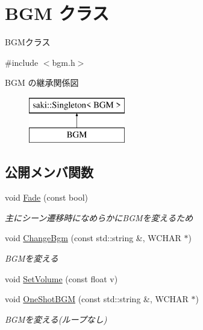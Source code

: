 \hypertarget{class_b_g_m}{}\section{B\+GM クラス}
\label{class_b_g_m}


B\+G\+Mクラス  




{\ttfamily \#include $<$bgm.\+h$>$}

B\+GM の継承関係図\begin{figure}[H]
\begin{center}
\leavevmode
\includegraphics[height=2.000000cm]{class_b_g_m}
\end{center}
\end{figure}
\subsection*{公開メンバ関数}
\begin{DoxyCompactItemize}
\item 
void \mbox{\hyperlink{class_b_g_m_a63645262b99c4d3aef0a58d9b972f674}{Fade}} (const bool)
\begin{DoxyCompactList}\small\item\em 主にシーン遷移時になめらかに\+B\+G\+Mを変えるため \end{DoxyCompactList}\item 
void \mbox{\hyperlink{class_b_g_m_a67e626cf0e596ca4fcf74df02fadf882}{Change\+Bgm}} (const std\+::string \&, W\+C\+H\+AR $\ast$)
\begin{DoxyCompactList}\small\item\em B\+G\+Mを変える \end{DoxyCompactList}\item 
void \mbox{\hyperlink{class_b_g_m_a6d5d9eddf086075d2b579c3a8061cc8c}{Set\+Volume}} (const float v)
\item 
void \mbox{\hyperlink{class_b_g_m_a5aaf11289bdf7eddba2ee3af7995b4fc}{One\+Shot\+B\+GM}} (const std\+::string \&, W\+C\+H\+AR $\ast$)
\begin{DoxyCompactList}\small\item\em B\+G\+Mを変える(ループなし) \end{DoxyCompactList}\end{DoxyCompactItemize}
